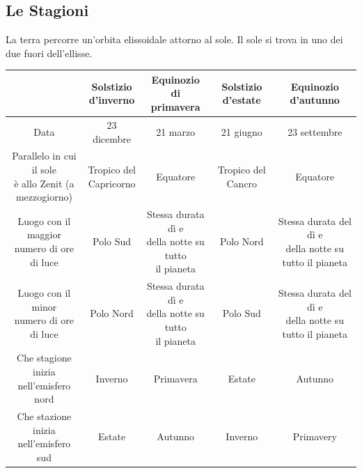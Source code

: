 \documentclass[a4paper]{article}
\begin{document}
\subsection{Le Stagioni}

La terra percorre un'orbita elissoidale attorno al sole. Il sole si trova in uno dei due fuori dell'ellisse.



\begin{center}
\begin{tabular}{|c|c|c|c|c|}
    \hline
    & \makecell{Solstizio \\ d'inverno} & \makecell{Equinozio di\\ primavera} & \makecell{Solstizio \\d'estate} & \makecell{Equinozio \\d'autunno} \\
    \hline
    Data & 23 dicembre & 21 marzo & 21 giugno & 23 settembre \\
    \hline
    \makecell{Parallelo in cui il sole \\ è allo Zenit (a \\ mezzogiorno)} & \makecell{Tropico del \\Capricorno} & Equatore & Tropico del Cancro & Equatore \\
    \hline
    \makecell{Luogo con il maggior \\ numero di ore di luce} & Polo Sud & \makecell{Stessa durata dì e \\ della notte su tutto \\ il pianeta} & Polo Nord & \makecell{Stessa durata del dì e\\ della notte su tutto il pianeta} \\
    \hline
    \makecell{Luogo con il minor \\ numero di ore di luce} & Polo Nord & \makecell{Stessa durata dì e \\ della notte su tutto \\ il pianeta} & Polo Sud & \makecell{Stessa durata del dì e\\ della notte su tutto il pianeta} \\
    \hline
    \makecell{Che stagione inizia \\ nell'emisfero nord} & Inverno & Primavera & Estate & Autunno \\
    \hline
    \makecell{Che stazione inizia \\ nell'emisfero sud} & Estate & Autunno & Inverno & Primavery \\
    \hline
\end{tabular}
\end{center}
\end{document}
